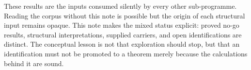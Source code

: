\documentclass[11pt,a4paper]{article}
\theoremstyle{definition}
\begin{document}
    These results are the inputs consumed silently by every other sub-programme.
    Reading the corpus without this note is possible but the origin of each structural
    input remains opaque.
    This note makes the mixed status explicit: proved no-go results, structural
    interpretations, supplied carriers, and open identifications are distinct.  The
    conceptual lesson is not that exploration should stop, but that an identification must
    not be promoted to a theorem merely because the calculations behind it are sound.

    \newpage
    
    
\end{document}
